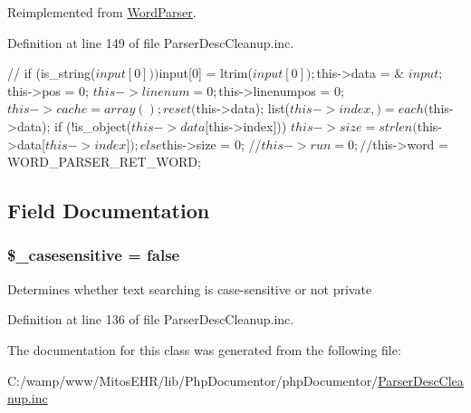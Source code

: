 \-Reimplemented from \hyperlink{class_word_parser_a1545e049222168d79849355fe4343067}{\-Word\-Parser}.



\-Definition at line 149 of file \-Parser\-Desc\-Cleanup.\-inc.


\begin{DoxyCode}
    {
//        if (is_string($input[0])) $input[0] = ltrim($input[0]);
        $this->data = & $input;
        $this->pos = 0;
        $this->linenum = 0;
        $this->linenumpos = 0;
        $this->cache = array();
        reset($this->data);
        list($this->index,) = each($this->data);
        if (!is_object($this->data[$this->index]))
        $this->size = strlen($this->data[$this->index]);
        else $this->size = 0;
        //$this->run = 0;
        //$this->word = WORD_PARSER_RET_WORD;
    }
\end{DoxyCode}


\subsection{\-Field \-Documentation}
\hypertarget{class_object_word_parser_a5b830a5b931a201674311dfdee4dd6c5}{
\subsubsection[{\$\-\_\-casesensitive}]{\setlength{\rightskip}{0pt plus 5cm}\$\-\_\-casesensitive = false}}\label{class_object_word_parser_a5b830a5b931a201674311dfdee4dd6c5}
\-Determines whether text searching is case-\/sensitive or not  private 

\-Definition at line 136 of file \-Parser\-Desc\-Cleanup.\-inc.



\-The documentation for this class was generated from the following file\-:\begin{DoxyCompactItemize}
\item 
\-C\-:/wamp/www/\-Mitos\-E\-H\-R/lib/\-Php\-Documentor/php\-Documentor/\hyperlink{_parser_desc_cleanup_8inc}{\-Parser\-Desc\-Cleanup.\-inc}\end{DoxyCompactItemize}
